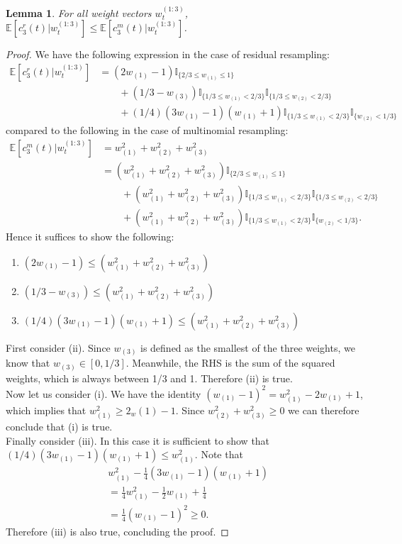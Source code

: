 \documentclass[fleqn]{article}
\newtheorem{lemma}{Lemma}
\theoremstyle{definition}
\newcommand{\E}{\mathbb{E}}
\newcommand{\I}[1]{\mathbb{I}_{\{#1\}}}
\newcommand{\wt}[2][t]{w_{#1}^{(#2)}}
\begin{document}
\vspace{0.6cm}

\begin{lemma}
For all weight vectors $\wt{1:3}$, 
$\E[c_3^r(t) |\wt{1:3}] \leq \E[c_3^m(t) |\wt{1:3}]$.
\end{lemma}
\begin{proof}
We have the following expression in the case of residual resampling:
\begin{align*}
\E[c_3^r(t) |\wt{1:3}] &= (2w_{(1)} -1) \I{2/3 \leq w_{(1)} \leq 1} \\
&\qquad + (1/3 - w_{(3)}) \I{1/3 \leq w_{(1)} < 2/3} \I{1/3 \leq w_{(2)} < 2/3} \\
&\qquad + (1/4)(3w_{(1)} -1)(w_{(1)} +1) \I{1/3 \leq w_{(1)} < 2/3} \I{w_{(2)} <1/3}
\end{align*}
compared to the following in the case of multinomial resampling:
\begin{align*}
\E[c_3^m(t) |\wt{1:3}] &= w_{(1)}^2 + w_{(2)}^2 + w_{(3)}^2 \\
&= (w_{(1)}^2 + w_{(2)}^2 + w_{(3)}^2) \I{2/3 \leq w_{(1)} \leq 1} \\
&\qquad + (w_{(1)}^2 + w_{(2)}^2 + w_{(3)}^2) \I{1/3 \leq w_{(1)} < 2/3} \I{1/3 \leq w_{(2)} < 2/3} \\
&\qquad + (w_{(1)}^2 + w_{(2)}^2 + w_{(3)}^2) \I{1/3 \leq w_{(1)} < 2/3} \I{w_{(2)} <1/3}.
\end{align*}
Hence it suffices to show the following:
\begin{enumerate}[label=(\roman*)]
\item $(2w_{(1)} -1) \leq (w_{(1)}^2 + w_{(2)}^2 + w_{(3)}^2)$
\item $ (1/3 - w_{(3)}) \leq (w_{(1)}^2 + w_{(2)}^2 + w_{(3)}^2)$
\item $ (1/4)(3w_{(1)} -1)(w_{(1)} +1) \leq (w_{(1)}^2 + w_{(2)}^2 + w_{(3)}^2)$\\
\end{enumerate}
First consider (ii). Since $w_{(3)}$ is defined as the smallest of the three weights, we know that $w_{(3)} \in [0,1/3]$. Meanwhile, the RHS is the sum of the squared weights, which is always between 1/3 and 1. Therefore (ii) is true.\\[7pt]
Now let us consider (i). We have the identity $(w_{(1)} -1)^2 = w_{(1)}^2 -2w_{(1)} +1$, which implies that $w_{(1)}^2 \geq 2_w{(1)} - 1$. Since $w_{(2)}^2 + w_{(3)}^2 \geq 0$ we can therefore conclude that (i) is true.\\[7pt]
Finally consider (iii). In this case it is sufficient to show that $(1/4)(3w_{(1)} -1)(w_{(1)} +1) \leq w_{(1)}^2$. Note that
\begin{align*}
& w_{(1)}^2 - \frac{1}{4}(3w_{(1)} -1)(w_{(1)} +1) \\
& = \frac{1}{4} w_{(1)}^2- \frac{1}{2} w_{(1)} + \frac{1}{4} \\
& = \frac{1}{4} (w_{(1)} -1)^2 \geq 0.
\end{align*}
Therefore (iii) is also true, concluding the proof.
\end{proof}
\end{document}
